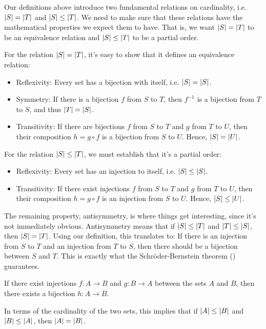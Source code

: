 \documentclass[11pt,twoside=off,numbers=noenddot]{scrbook}
\begin{document}
\begin{remark}
    Our definitions above introduce two fundamental relations on cardinality, i.e. $| S | = | T |$ and $| S | \leq | T |$. We need to make sure that these relations have the mathematical properties we expect them to have. That is, we want $| S | = | T |$ to be an equivalence relation and $| S | \leq | T |$ to be a partial order.

    For the relation $| S | = | T |$, it's easy to show that it defines an equivalence relation:
    \begin{itemize}
        \item Reflexivity: Every set has a bijection with itself, i.e. $| S | = | S |$.
        \item Symmetry: If there is a bijection $f$ from $S$ to $T$, then $f^{-1}$ is a bijection from $T$ to $S$, and thus $| T | = | S |$.
        \item Transitivity: If there are bijections $f$ from $S$ to $T$ and $g$ from $T$ to $U$, then their composition $h = g \circ f$ is a bijection from $S$ to $U$. Hence, $| S | = | U |$.
    \end{itemize}

    For the relation $| S | \leq | T |$, we must establish that it's a partial order:
    \begin{itemize}
        \item Reflexivity: Every set has an injection to itself, i.e. $| S | \leq | S |$.
        \item Transitivity: If there exist injections $f$ from $S$ to $T$ and $g$ from $T$ to $U$, then their composition $h = g \circ f$ is an injection from $S$ to $U$. Hence, $| S | \leq | U |$.
    \end{itemize}

    The remaining property, antisymmetry, is where things get interesting, since it's not immediately obvious. Antisymmetry means that if $| S | \leq | T |$ and $| T | \leq | S |$, then $| S | = | T |$. Using our definition, this translates to: If there is an injection from $S$ to $T$ and an injection from $T$ to $S$, then there should be a bijection between $S$ and $T$. This is exactly what the Schröder-Bernstein theorem () guarantees.
\end{remark}

\begin{theorem}
    If there exist injections $f : A \to B$ and $g : B \to A$ between the sets $A$ and $B$, then there exists a bijection $h : A \to B$.

    In terms of the cardinality of the two sets, this implies that if $| A | \leq | B |$ and $| B | \leq | A |$, then $| A | = | B |$.
\end{theorem}
\end{document}

